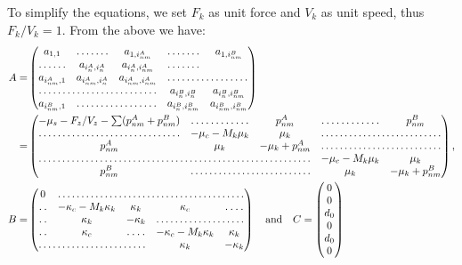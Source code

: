 \documentclass[a4paper,12pt]{article}
\begin{document}
To simplify the equations, we set $F_k$ as unit force and $V_k$ as unit
speed, thus $F_k/V_k = 1$. From the above we have:
\begin{equation}
  \begin{aligned}
    A = &%
    \begin{pmatrix}
      a_{1,1} & \hdotsfor{1} & a_{1, i_{nm}^A} &%
      \hdotsfor{1} & a_{1, i_{nm}^B}\\
      \hdotsfor{1} & a_{i_{n}^A, i_{n}^A}& %
      a_{i_{n}^A, i_{nm}^A} & \hdotsfor{1}\\
      a_{i_{nm}^A, 1} & a_{i_{nm}^A, i_{n}^A} & a_{i_{nm}^A, i_{nm}^A}&%
      \hdotsfor{2}\\
      \hdotsfor{3} & a_{i_{n}^B, i_{n}^B}& a_{i_{n}^B, i_{nm}^B}\\
      a_{i_{nm}^B,1} & \hdotsfor{2} &  a_{i_{n}^B, i_{nm}^B} &%
      a_{i_{nm}^B, i_{nm}^B}\\
    \end{pmatrix}\\
    =  & \begin{pmatrix}
      -\mu_s - F_z/V_z - \sum (p_{nm}^A + p_{nm}^B)& \hdotsfor{1} & p_{nm}^A &%
      \hdotsfor{1} &  p_{nm}^B\\
      \hdotsfor{1} &  -\mu_c - M_k \mu_k& \mu_k & \hdotsfor{2}\\
      p_{nm}^A & \mu_k & - \mu_k + p_{nm}^A & \hdotsfor{2}\\
      \hdotsfor{3} & -\mu_c - M_k \mu_k & \mu_k\\
      p_{nm}^B & \hdotsfor{2} & \mu_k & - \mu_k + p_{nm}^B \\
    \end{pmatrix}, \\
    B = &%
    \begin{pmatrix}
      \,0\, & \hdotsfor{4}\\
      \hdotsfor{1} & - \kappa_c - M_k \kappa_k & \kappa_k &%
      \kappa_c & \hdotsfor{1} \\
      \hdotsfor{1} & \kappa_k & -\kappa_k &  \hdotsfor{2}\\
      \hdotsfor{1} & \kappa_c & \hdotsfor{1} &%
      -\kappa_c - M_k \kappa_k & \kappa_k \\
      \hdotsfor{3}  & \kappa_k & - \kappa_k\\
    \end{pmatrix}%
    \quad \mbox{and} \quad C = %
    \begin{pmatrix}
      0\\
      0\\
      d_0\\
      0\\
      d_0\\
      0\\
    \end{pmatrix}
  \end{aligned}
\end{equation}
\end{document}
